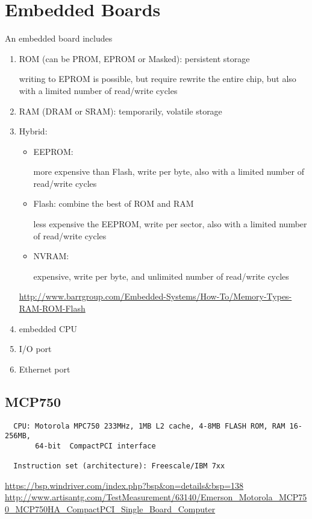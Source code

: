 \section{Embedded Boards}
\label{sec:embedded-boards}


An embedded board includes
\begin{enumerate}
  \item ROM (can be PROM, EPROM or Masked): persistent storage
  
  writing to EPROM is possible, but require rewrite the entire chip, but
  also with a limited number of read/write cycles 
  
  
  \item RAM (DRAM or SRAM): temporarily, volatile storage
  
  \item Hybrid:
  \begin{itemize}
    \item EEPROM:
    
   more expensive than Flash, write per byte, also with a limited number of
   read/write cycles
       
    \item Flash: combine the best of ROM and RAM
    
   less expensive the EEPROM, write per sector, also with a limited number of
   read/write cycles
       
    \item NVRAM:
    
   expensive, write per byte, and unlimited number of read/write cycles 
  \end{itemize}
  \url{http://www.barrgroup.com/Embedded-Systems/How-To/Memory-Types-RAM-ROM-Flash}
  
   
  \item embedded CPU
  \item I/O port
  \item Ethernet port
\end{enumerate}

\subsection{MCP750}
\label{sec:MCP750}

  \begin{verbatim}
  CPU: Motorola MPC750 233MHz, 1MB L2 cache, 4-8MB FLASH ROM, RAM 16-256MB, 
       64-bit  CompactPCI interface 
  
  Instruction set (architecture): Freescale/IBM 7xx
  \end{verbatim}
  \url{https://bsp.windriver.com/index.php?bsp&on=details&bsp=138}
  \url{http://www.artisantg.com/TestMeasurement/63140/Emerson_Motorola_MCP750_MCP750HA_CompactPCI_Single_Board_Computer}

